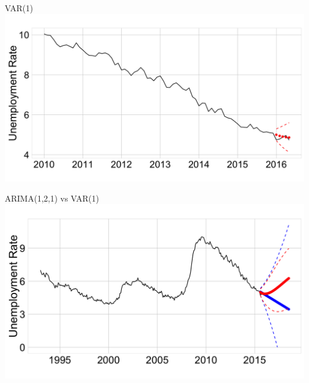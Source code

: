 \documentclass[ignorenonframetext]{beamer}
\begin{document}
  	\begin{frame}{VAR(1) }
  		 \includegraphics[width=\linewidth]{images/varpred}
  	\end{frame}
 
  	\begin{frame}{ARIMA(1,2,1) vs VAR(1) }
  		 \includegraphics[width=\linewidth]{images/arimavarforecast}
  	\end{frame}
 
\end{document}
